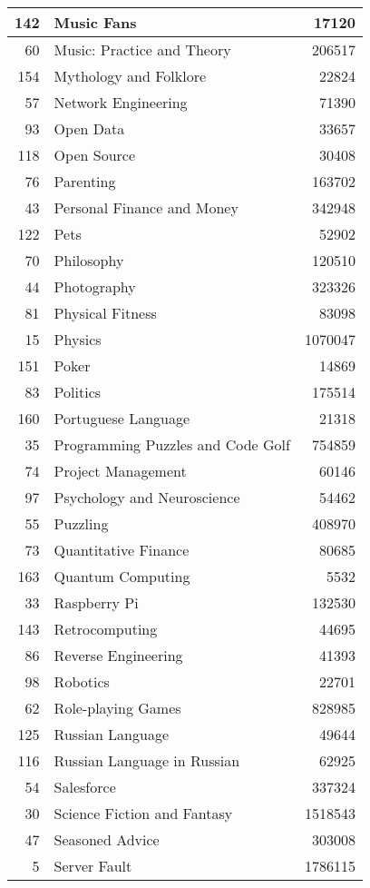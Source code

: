 \documentclass[]{book}
\theoremstyle{definition}
\theoremstyle{definition}
\theoremstyle{definition}
\theoremstyle{remark}
\begin{document}
\begin{tabular}{r|l|r}
\hline
142 & Music Fans & 17120\\
\hline
60 & Music: Practice and Theory & 206517\\
\hline
154 & Mythology and Folklore & 22824\\
\hline
57 & Network Engineering & 71390\\
\hline
93 & Open Data & 33657\\
\hline
118 & Open Source & 30408\\
\hline
76 & Parenting & 163702\\
\hline
43 & Personal Finance and Money & 342948\\
\hline
122 & Pets & 52902\\
\hline
70 & Philosophy & 120510\\
\hline
44 & Photography & 323326\\
\hline
81 & Physical Fitness & 83098\\
\hline
15 & Physics & 1070047\\
\hline
151 & Poker & 14869\\
\hline
83 & Politics & 175514\\
\hline
160 & Portuguese Language & 21318\\
\hline
35 & Programming Puzzles and Code Golf & 754859\\
\hline
74 & Project Management & 60146\\
\hline
97 & Psychology and Neuroscience & 54462\\
\hline
55 & Puzzling & 408970\\
\hline
73 & Quantitative Finance & 80685\\
\hline
163 & Quantum Computing & 5532\\
\hline
33 & Raspberry Pi & 132530\\
\hline
143 & Retrocomputing & 44695\\
\hline
86 & Reverse Engineering & 41393\\
\hline
98 & Robotics & 22701\\
\hline
62 & Role-playing Games & 828985\\
\hline
125 & Russian Language & 49644\\
\hline
116 & Russian Language in Russian & 62925\\
\hline
54 & Salesforce & 337324\\
\hline
30 & Science Fiction and Fantasy & 1518543\\
\hline
47 & Seasoned Advice & 303008\\
\hline
5 & Server Fault & 1786115\\

\end{tabular}
\end{document}
